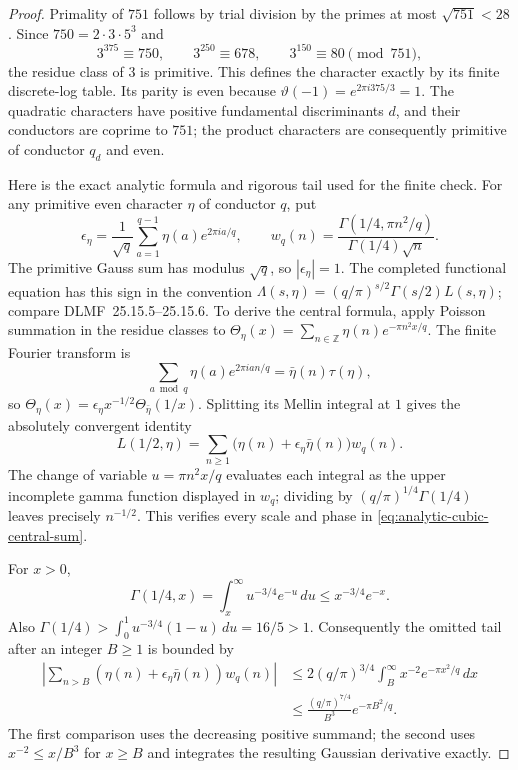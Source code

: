 \begin{proof}
Primality of $751$ follows by trial division by the primes at
most $\sqrt{751}<28$. Since $750=2\cdot3\cdot5^3$ and
\[
 3^{375}\equiv750,\qquad3^{250}\equiv678,\qquad
 3^{150}\equiv80\pmod{751},
\]
the residue class of $3$ is primitive. This defines the character
exactly by its finite discrete-log table. Its parity is even
because $\vartheta(-1)=e^{2\pi i375/3}=1$. The quadratic
characters have positive fundamental discriminants $d$, and
their conductors are coprime to $751$; the product characters
are consequently primitive of conductor $q_d$ and even.

Here is the exact analytic formula and rigorous tail used for
the finite check. For any primitive even character $\eta$ of
conductor $q$, put
\[
 \epsilon_\eta=\frac1{\sqrt q}
          \sum_{a=1}^{q-1}\eta(a)e^{2\pi ia/q},\qquad
 w_q(n)=\frac{\Gamma(1/4,\pi n^2/q)}{\Gamma(1/4)\sqrt n}.
\]
The primitive Gauss sum has modulus $\sqrt q$, so
$|\epsilon_\eta|=1$. The completed functional equation has
this sign in the convention
$\Lambda(s,\eta)=(q/\pi)^{s/2}\Gamma(s/2)L(s,\eta)$;
compare DLMF~25.15.5--25.15.6. To derive the central formula,
apply Poisson summation in the residue classes to
$\Theta_\eta(x)=\sum_{n\in\mathbb Z}\eta(n)e^{-\pi n^2x/q}$.
The finite Fourier transform is
\[
 \sum_{a\bmod q}\eta(a)e^{2\pi ian/q}
              =\bar\eta(n)\tau(\eta),
\]
so
$\Theta_\eta(x)=\epsilon_\eta x^{-1/2}
\Theta_{\bar\eta}(1/x)$. Splitting its Mellin integral at $1$
gives the absolutely convergent identity
\begin{equation}\label{eq:analytic-cubic-central-sum}
 L(1/2,\eta)=\sum_{n\ge1}
            \bigl(\eta(n)+\epsilon_\eta\bar\eta(n)\bigr)w_q(n).
\end{equation}
The change of variable $u=\pi n^2x/q$ evaluates each integral
as the upper incomplete gamma function displayed in $w_q$;
dividing by $(q/\pi)^{1/4}\Gamma(1/4)$ leaves precisely
$n^{-1/2}$. This verifies every scale and phase in
\eqref{eq:analytic-cubic-central-sum}.

For $x>0$,
\[
 \Gamma(1/4,x)=\int_x^\infty u^{-3/4}e^{-u}\,du
                  \le x^{-3/4}e^{-x}.
\]
Also
$\Gamma(1/4)>\int_0^1u^{-3/4}(1-u)\,du=16/5>1$.
Consequently the omitted tail after an integer $B\ge1$ is
bounded by
\begin{equation}\label{eq:analytic-cubic-tail}
 \begin{split}
 \left|\sum_{n>B}
       (\eta(n)+\epsilon_\eta\bar\eta(n))w_q(n)\right|
 &\le 2(q/\pi)^{3/4}
       \int_B^\infty x^{-2}e^{-\pi x^2/q}\,dx\\
 &\le\frac{(q/\pi)^{7/4}}{B^3}
                         e^{-\pi B^2/q}.
 \end{split}
\end{equation}
The first comparison uses the decreasing positive summand;
the second uses $x^{-2}\le x/B^3$ for $x\ge B$ and integrates
the resulting Gaussian derivative exactly.


\end{proof}
